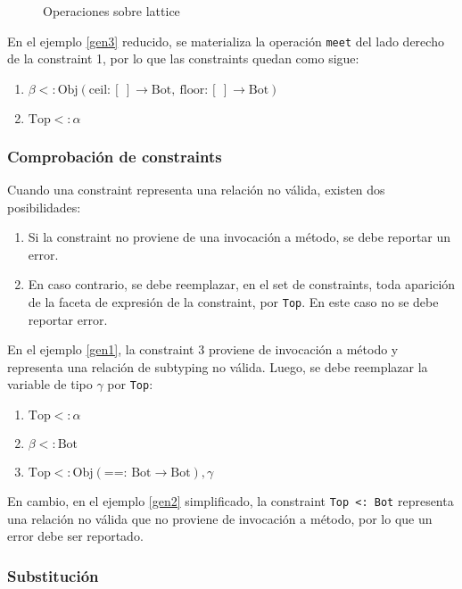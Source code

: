 \begin{figure}[ht]
  \centering
  \label{latticexy}
  \caption{Operaciones sobre lattice}
\end{figure}

En el ejemplo \ref{gen3} reducido, se materializa la operación \texttt{meet} del lado derecho de la constraint 1, por lo que las constraints quedan como sigue:

\begin{enumerate}
  \item $\beta <: \text{Obj}(\text{ceil}: [\ ] \rightarrow \text{Bot},\ \text{floor}: [\ ] \rightarrow \text{Bot})$
  \item $\text{Top} <: \alpha$
\end{enumerate}

\subsubsection{Comprobación de constraints}
Cuando una constraint representa una relación no válida, existen dos posibilidades:

\begin{enumerate}
  \item Si la constraint no proviene de una invocación a método, se debe reportar un error.
  \item En caso contrario, se debe reemplazar, en el set de constraints, toda aparición de la faceta de expresión de la constraint, por \texttt{Top}. En este caso no se debe reportar error.
\end{enumerate}

En el ejemplo \ref{gen1}, la constraint 3 proviene de invocación a método y representa una relación de subtyping no válida. Luego, se debe reemplazar la variable de tipo $\gamma$ por \texttt{Top}:

\begin{enumerate}
  \item $\text{Top} <: \alpha$
  \item $\beta <: \text{Bot}$
  \item $\text{Top} <: \text{Obj}(\text{==: }\text{Bot} \rightarrow \text{Bot}), \gamma$
\end{enumerate}

En cambio, en el ejemplo \ref{gen2} simplificado, la constraint \texttt{Top <: Bot} representa una relación no válida que no proviene de invocación a método, por lo que un error debe ser reportado.

\subsubsection{Substitución}

